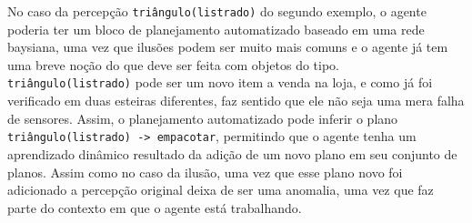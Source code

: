 \begin{example}
    No caso da percepção \texttt{triângulo(listrado)} do segundo exemplo, o agente poderia ter um bloco de planejamento automatizado baseado em uma rede baysiana, uma vez que ilusões podem ser muito mais comuns e o agente já tem uma breve noção do que deve ser feita com objetos do tipo. \texttt{triângulo(listrado)} pode ser um novo item a venda na loja, e como já foi verificado em duas esteiras diferentes, faz sentido que ele não seja uma mera falha de sensores. Assim, o planejamento automatizado pode inferir o plano \texttt{triângulo(listrado) -> empacotar}, permitindo que o agente tenha um aprendizado dinâmico resultado da adição de um novo plano em seu conjunto de planos. Assim como no caso da ilusão, uma vez que esse plano novo foi adicionado a percepção original deixa de ser uma anomalia, uma vez que faz parte do contexto em que o agente está trabalhando.

\end{example}{}
